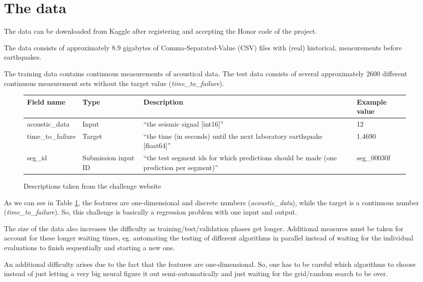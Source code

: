 \documentclass[colorback,accentcolor=tud9c,12pt]{tudreport}
\begin{document}
	\section{The data}
	The data can be downloaded from Kaggle after registering and accepting the Honor code of the project.
	
	The data consists of approximately 8.9 gigabytes of Comma-Separated-Value (CSV) files with (real) historical, measurements before earthquakes.
	
	The training data contains continuous measurements of acoustical data.
	The test data consists of several approximately 2600 different continuous measurement sets without the target value (\textit{time\_to\_failure}).
	
	
	\begin{figure}[htp]
		\begin{tabularx}{\textwidth}{ L{8}|L{5}|L{12}|L{7} }
			Field name & Type & Description & Example value \\
			\hline 
			acoustic\_data & Input & ``the seismic signal [int16]'' & 12 \\
			\hline 
			time\_to\_failure & Target & ``the time (in seconds) until the next laboratory earthquake [float64]''  & 1.4690 \\
			\hline 
			seg\_id & Submission input ID & ``the test segment ids for which predictions should be made (one prediction per segment)'' & seg\_00030f \\
		\end{tabularx}
		\caption{Descriptions taken from the challenge website}
		\label{table:data}
	\end{figure}
	
	
	As we can see in Table \ref{table:data}, the features are one-dimensional and discrete numbers (\textit{acoustic\_data}), while the target is a continuous number (\textit{time\_to\_failure}).
	So, this challenge is basically a regression problem with one input and output.
	
	The size of the data also increases the difficulty as training/test/validation phases get longer. Additional measures must be taken for account for these longer waiting times, eg. automating the testing of different algorithms in parallel instead of waiting for the individual evaluations to finish sequentially and starting a new one.
	
	An additional difficulty arises due to the fact that the features are one-dimensional. So, one has to be careful which algorithms to choose instead of just letting a very big neural figure it out semi-automatically and just waiting for the grid/random search to be over.
	
\end{document}
